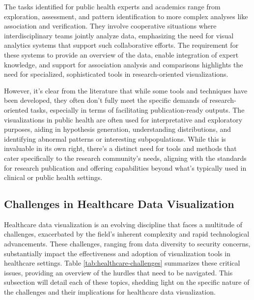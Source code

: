 The tasks identified for public health experts and academics range from exploration, assessment, and pattern identification to more complex analyses like association and verification. They involve cooperative situations where interdisciplinary teams jointly analyze data, emphasizing the need for visual analytics systems that support such collaborative efforts. The requirement for these systems to provide an overview of the data, enable integration of expert knowledge, and support for association analysis and comparisons highlights the need for specialized, sophisticated tools in research-oriented visualizations.

However, it's clear from the literature that while some tools and techniques have been developed, they often don't fully meet the specific demands of research-oriented tasks, especially in terms of facilitating publication-ready outputs. The visualizations in public health are often used for interpretative and exploratory purposes, aiding in hypothesis generation, understanding distributions, and identifying abnormal patterns or interesting subpopulations. While this is invaluable in its own right, there's a distinct need for tools and methods that cater specifically to the research community's needs, aligning with the standards for research publication and offering capabilities beyond what's typically used in clinical or public health settings.

\subsection{Challenges in Healthcare Data Visualization}\label{challenges-in-healthcare-data-visualization}

Healthcare data visualization is an evolving discipline that faces a multitude of challenges, exacerbated by the field's inherent complexity and rapid technological advancements. These challenges, ranging from data diversity to security concerns, substantially impact the effectiveness and adoption of visualization tools in healthcare settings. Table \ref{tab:healthcare-challenges} summarizes these critical issues, providing an overview of the hurdles that need to be navigated. This subsection will detail each of these topics, shedding light on the specific nature of the challenges and their implications for healthcare data visualization.

